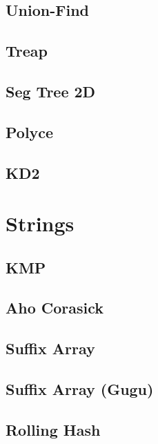 \subsection{Union-Find}
\raggedbottom
\hrulefill
\subsection{Treap}
\raggedbottom
\hrulefill
\subsection{Seg Tree 2D}
\raggedbottom
\hrulefill
\subsection{Polyce}
\raggedbottom
\hrulefill
\subsection{KD2}
\raggedbottom
\hrulefill

\section{Strings}
\subsection{KMP}
\raggedbottom
\hrulefill
\subsection{Aho Corasick}
\raggedbottom
\hrulefill
\subsection{Suffix Array}
\raggedbottom
\hrulefill
\subsection{Suffix Array (Gugu)}
\raggedbottom
\hrulefill
\subsection{Rolling Hash}
\raggedbottom
\hrulefill
